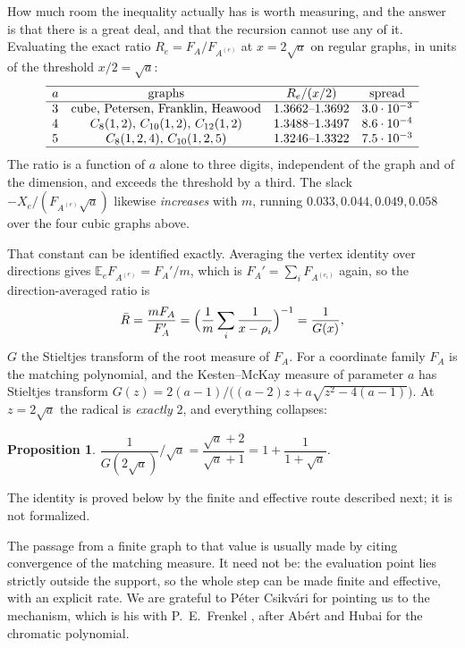 \documentclass[11pt]{article}
\newtheorem{proposition}[theorem]{Proposition}
\theoremstyle{remark}
\begin{document}
How much room the inequality actually has is worth measuring, and the answer is that
there is a great deal, and that the recursion cannot use any of it. Evaluating the
exact ratio $R_e=F_A/F_{A^{(e)}}$ at $x=2\sqrt a$ on regular graphs, in units of the
threshold $x/2=\sqrt a$:
\[
\begin{array}{lccc}
\hline
a & \text{graphs} & R_e/(x/2) & \text{spread}\\
\hline
3 & \text{cube, Petersen, Franklin, Heawood} & 1.3662\text{--}1.3692 & 3.0\cdot10^{-3}\\
4 & C_8(1,2),\,C_{10}(1,2),\,C_{12}(1,2) & 1.3488\text{--}1.3497 & 8.6\cdot10^{-4}\\
5 & C_8(1,2,4),\,C_{10}(1,2,5) & 1.3246\text{--}1.3322 & 7.5\cdot10^{-3}\\
\hline
\end{array}
\]
The ratio is a function of $a$ alone to three digits, independent of the graph and of the
dimension, and exceeds the threshold by a third. The slack $-X_e/(F_{A^{(e)}}\sqrt a)$
likewise \emph{increases} with $m$, running $0.033,0.044,0.049,0.058$ over the four cubic
graphs above.

That constant can be identified exactly. Averaging the vertex identity over directions
gives $\mathbb E_eF_{A^{(e)}}=F_A'/m$, which is $F_A'=\sum_iF_{A^{(e_i)}}$ again, so
the direction-averaged ratio is
\[
\bar R=\frac{mF_A}{F_A'}=\Bigl(\frac1m\sum_i\frac1{x-\rho_i}\Bigr)^{-1}=\frac1{G(x)},
\]
$G$ the Stieltjes transform of the root measure of $F_A$. For a coordinate family $F_A$ is
the matching polynomial, and the Kesten--McKay measure of parameter $a$ has Stieltjes
transform $G(z)=2(a-1)/\bigl((a-2)z+a\sqrt{z^2-4(a-1)}\bigr)$. At $z=2\sqrt a$ the radical
is \emph{exactly} $2$, and everything collapses:

\begin{proposition}\label{prop:km}
$\dfrac{1}{G(2\sqrt a)}\Big/\sqrt a=\dfrac{\sqrt a+2}{\sqrt a+1}=1+\dfrac1{1+\sqrt a}$.
\end{proposition}

The identity is proved below by the finite and effective route described next; it is not
formalized.

The passage from a finite graph to that value is usually made by citing convergence of the
matching measure. It need not be: the evaluation point lies strictly outside the support,
so the whole step can be made finite and effective, with an explicit rate. We are grateful
to P\'eter Csikv\'ari for pointing us to the mechanism, which is his with P.\ E.\ Frenkel
\cite{CsF}, after Ab\'ert and Hubai for the chromatic polynomial.
\end{document}

